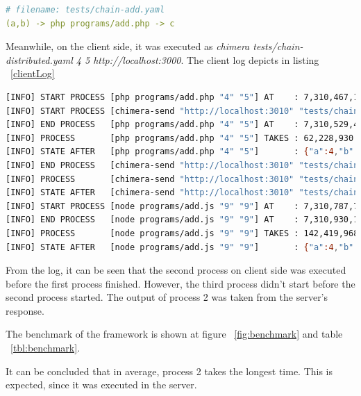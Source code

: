 \documentclass[conference]{IEEEtran}
\begin{document}
\begin{lstlisting}[caption=Server side YAML-Chain, label=serverYaml, language=yaml, basicstyle=\small, breaklines=true]
# filename: tests/chain-add.yaml
(a,b) -> php programs/add.php -> c
\end{lstlisting}

Meanwhile, on the client side, it was executed as {\it chimera tests/chain-distributed.yaml 4 5 http://localhost:3000}. 
The client log depicts in listing ~\ref{clientLog}

\begin{lstlisting}[caption=Client Log, label=clientLog, language=bash, basicstyle=\small, breaklines=true]
[INFO] START PROCESS [php programs/add.php "4" "5"] AT    : 7,310,467,197,740
[INFO] START PROCESS [chimera-send "http://localhost:3010" "tests/chain-add.yaml" "4" "5"] AT    : 7,310,489,588,596
[INFO] END PROCESS   [php programs/add.php "4" "5"] AT    : 7,310,529,490,373
[INFO] PROCESS       [php programs/add.php "4" "5"] TAKES : 62,228,930 NS
[INFO] STATE AFTER   [php programs/add.php "4" "5"]       : {"a":4,"b":5,"server":"http://localhost:3010","c":9}
[INFO] END PROCESS   [chimera-send "http://localhost:3010" "tests/chain-add.yaml" "4" "5"] AT    : 7,310,786,490,287
[INFO] PROCESS       [chimera-send "http://localhost:3010" "tests/chain-add.yaml" "4" "5"] TAKES : 296,877,900 NS
[INFO] STATE AFTER   [chimera-send "http://localhost:3010" "tests/chain-add.yaml" "4" "5"]       : {"a":4,"b":5,"server":"http://localhost:3010","c":9,"d":9}
[INFO] START PROCESS [node programs/add.js "9" "9"] AT    : 7,310,787,707,145
[INFO] END PROCESS   [node programs/add.js "9" "9"] AT    : 7,310,930,153,276
[INFO] PROCESS       [node programs/add.js "9" "9"] TAKES : 142,419,968 NS
[INFO] STATE AFTER   [node programs/add.js "9" "9"]       : {"a":4,"b":5,"server":"http://localhost:3010","c":9,"d":9,"e":18}
\end{lstlisting}

From the log, it can be seen that the second process on client side was executed before the first process finished.
However, the third process didn't start before the second process started. The output of process 2  was taken from the
server's response.

The benchmark of the framework is shown at figure ~\ref{fig:benchmark} and table ~\ref{tbl:benchmark}.

It can be concluded that in average, process 2 takes the longest time. This is expected, since it was executed in the server. 
\end{document}
